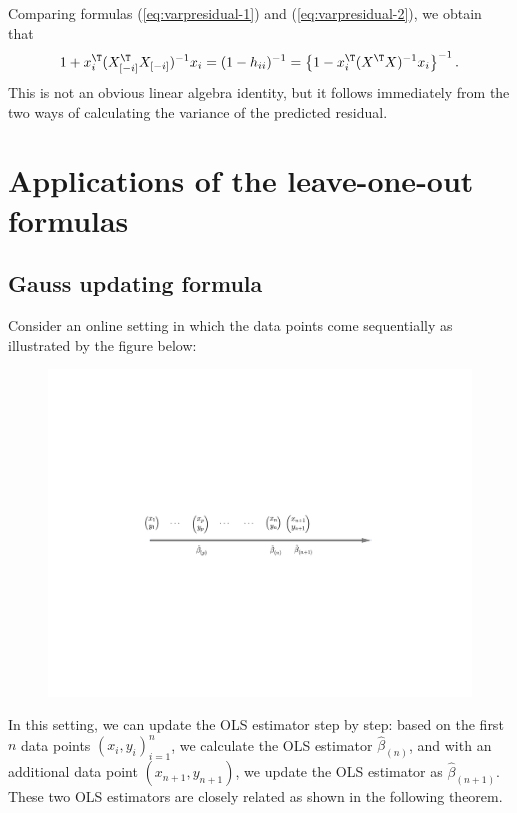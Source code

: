 Comparing formulas (\ref{eq:varpresidual-1}) and (\ref{eq:varpresidual-2}),
we obtain that 
\[
1+x_{i}^{\T}(X_{[-i]}^{\T}X_{[-i]})^{-1}x_{i}=(1-h_{ii})^{-1}=\left\{ 1 -  x_{i}^{\T}(X^{\T}X)^{-1}x_{i}\right\} ^{-1}.
\]
This  is not an obvious linear algebra identity, but it follows immediately from
the two ways of calculating the variance of the predicted residual. 


\section{Applications of the leave-one-out formulas}

\subsection{Gauss updating formula}

Consider an online setting in which the data points come sequentially
as illustrated by the figure below:

\begin{figure}[h]
\centering
\includegraphics[width = \textwidth]{figures/gaussupdating.pdf}
\end{figure}


In this setting, we can update
the OLS estimator step by step: based on the first $n$ data points
$(x_{i},y_{i})_{i=1}^{n}$, we calculate the OLS estimator $\hat{\beta}_{(n)}$,
and with an additional data point $(x_{n+1},y_{n+1})$, we update
the OLS estimator as $\hat{\beta}_{(n+1)}$. These two OLS estimators
are closely related as shown in the following theorem. 


